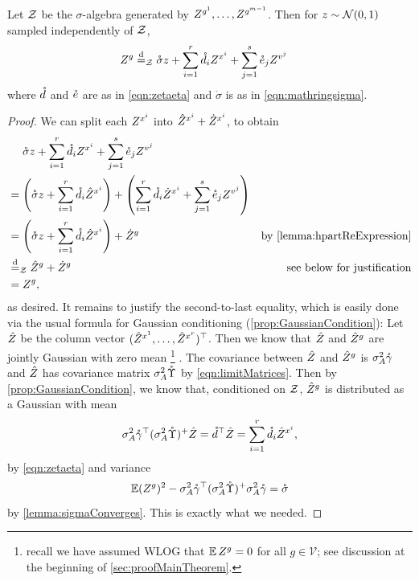 \documentclass[main.tex]{subfiles}
\begin{document}
\begin{lemma}\label{lemma:YgConditionalDistribution}
  Let $\mathcal{Z}$ be the $\sigma$-algebra generated by $Z^{g^1}, \ldots, Z^{g^{m-1}}$.
  Then for $z \sim \mathcal{N}(0, 1)$ sampled independently of $\mathcal{Z}$,
  \begin{align*}
  Z^{g}
    &\overset{\mathrm{d}}{=}_{\mathcal{Z}}
      \mathring \sigma z +
      \sum_{i=1}^r \mathring {d}_i Z^{x^i} +
      \sum_{j=1}^s \mathring {e}_j Z^{v^j}
  \end{align*}
  where $\mathring{d}$ and $\mathring{e}$ are as in \cref{eqn:zetaeta} and $\mathring \sigma$ is as in \cref{eqn:mathringsigma}.
  
  
\end{lemma}
\begin{proof}
  We can split each $ Z^{x^i}$ into $\hat Z^{x^i} + \dot Z^{x^i}$, to obtain
  \begin{align*}
  &\phantomeq
    \mathring \sigma z +
      \sum_{i=1}^r \mathring {\dme}_i  Z^{\xme^i} +
      \sum_{j=1}^s \mathring {\eme}_j  Z^{\vme^j}
    \\
  &=
    \left(\mathring \sigma z +
      \sum_{i=1}^r \mathring {\dme}_i \Zhat^{\xme^i}
      \right)
    +
    \left(
      \sum_{i=1}^r \mathring {\dme}_i \Zdot^{\xme^i}
      +
      \sum_{j=1}^s \mathring {\eme}_j  Z^{\vme^j}
    \right)
    \\
  &=
    \left(\mathring \sigma z +
      \sum_{i=1}^r \mathring {\dme}_i \Zhat^{\xme^i}
    \right)
    +
    \Zdot^{g}
  &{\text{by \cref{lemma:hpartReExpression}}}
    \\
  &\disteq_\prvZ
    \Zhat^{g}
    +
    \Zdot^{g}
  &{\text{see below for justification}}
    \\
  &=
     Z^{g},
  \end{align*}
  as desired.
  It remains to justify the second-to-last equality, which is easily done via the usual formula for Gaussian conditioning (\cref{prop:GaussianCondition}):
  Let $\hat Z$ be the column vector $(\hat Z^{x^1}, \ldots, \hat Z^{x^r})^\top$.
  Then we know that $\hat Z$ and $\hat Z^{g}$ are jointly Gaussian with zero mean%
  \footnote{recall we have assumed WLOG that $\operatorname*{\mathbb{E}} Z^g = 0$ for all $g \in \mathcal V$; see discussion at the beginning of \cref{sec:proofMainTheorem}.}%
  .
  The covariance between $\hat Z$ and $\hat Z^{g}$ is $\sigma_A^2 \mathring{\gamma}$ and $\hat Z$ has covariance matrix $\sigma_A^2 \mathring{\Upsilon}$ by \cref{eqn:limitMatrices}.
  Then by \cref{prop:GaussianCondition}, we know that, conditioned on $\mathcal{Z}$, $\hat Z^{g}$ is distributed as a Gaussian with mean
  \[\sigma_A^2 \mathring{\gamma}^\top (\sigma_A^2 \mathring{\Upsilon})^+ \hat Z
  =\mathring{d}^\top \hat Z
  =\sum_{i=1}^r \mathring {d}_i \hat Z^{x^i},\]
  by \cref{eqn:zetaeta}
  and variance
  \[
    \operatorname*{\mathbb{E}} (Z^{g})^2 - \sigma_A^2 \mathring{\gamma}^\top (\sigma_A^2 \mathring{\Upsilon})^+ \sigma_A^2 \mathring{\gamma}
    = \mathring\sigma\]
  by \cref{lemma:sigmaConverges}.
  This is exactly what we needed.
\end{proof}
\end{document}

